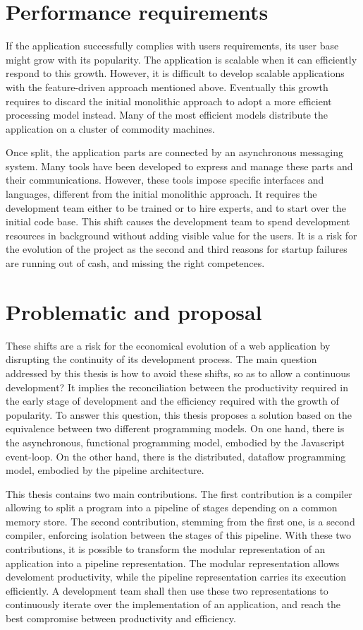 \section{Performance requirements}

If the application successfully complies with users requirements, its user base might grow with its popularity.
The application is scalable when it can efficiently respond to this growth.
However, it is difficult to develop scalable applications with the feature-driven approach mentioned above.
Eventually this growth requires to discard the initial monolithic approach to adopt a more efficient processing model instead.
Many of the most efficient models distribute the application on a cluster of commodity machines.

Once split, the application parts are connected by an asynchronous messaging system.
Many tools have been developed to express and manage these parts and their communications.
However, these tools impose specific interfaces and languages, different from the initial monolithic approach.
It requires the development team either to be trained or to hire experts, and to start over the initial code base.
This shift causes the development team to spend development resources in background without adding visible value for the users.
It is a risk for the evolution of the project as the second and third reasons for startup failures are running out of cash, and missing the right competences.

\section{Problematic and proposal}

These shifts are a risk for the economical evolution of a web application by disrupting the continuity of its development process.
The main question addressed by this thesis is how to avoid these shifts, so as to allow a continuous development?
It implies the reconciliation between the productivity required in the early stage of development and the efficiency required with the growth of popularity.
To answer this question, this thesis proposes a solution based on the equivalence between two different programming models.
On one hand, there is the asynchronous, functional programming model, embodied by the Javascript event-loop.
On the other hand, there is the distributed, dataflow programming model, embodied by the pipeline architecture.

This thesis contains two main contributions.
The first contribution is a compiler allowing to split a program into a pipeline of stages depending on a common memory store.
The second contribution, stemming from the first one, is a second compiler, enforcing isolation between the stages of this pipeline.
With these two contributions, it is possible to transform the modular representation of an application into a pipeline representation.
The modular representation allows develoment productivity, while the pipeline representation carries its execution efficiently.
A development team shall then use these two representations to continuously iterate over the implementation of an application, and reach the best compromise between productivity and efficiency.

